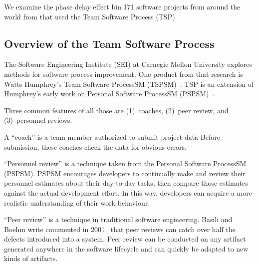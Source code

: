 We examine the phase delay effect bin
171 software projects from around the world from 
 that used the Team Software Process (TSP). 

\subsection{Overview of the Team Software Process}
The Software Engineering Institute (SEI) at
Carnegie Mellon University explores methods for software process improvement.
One product from that research is  
Watts Humphrey's  Team Software ProcessSM (TSPSM)~\cite{tsp00}. TSP is an extension of Humphrey's early
work on Personal Software
ProcessSM (PSPSM)~\cite{psp05}.




Three common features of all those  are (1)~coaches,
(2)~peer review, and  (3)~personnel reviews.
 
A ``coach'' is a team member  authorized to submit project data
Before submission,
these coaches check the data for obvious errors.

``Personnel review'' is a technique taken  from the Personal Software
ProcessSM (PSPSM). PSPSM encourages developers to continually make and review their personnel estimates
about their day-to-day tasks, then compare those estimates against the actual development effort.
In this way, developers can acquire a more realistic understanding of their work behaviour.

 
``Peer review'' is a  technique in
traditional software engineering.
 Basili and Boehm write  commented in 2001~\cite{boehm01} 
that peer reviews can catch over half the defects introduced into a system.
Peer review can be conducted on any artifact generated anywhere in the software
lifecycle and can quickly be adapted to new kinds of artifacts.




